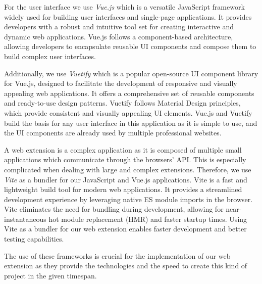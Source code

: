 For the user interface we use \emph{Vue.js} \cite{vuejs} which is a versatile JavaScript framework widely used for building user
interfaces and single-page applications. It provides developers with a robust and intuitive tool set for creating interactive
and dynamic web applications. Vue.js follows a component-based architecture, allowing developers to encapsulate reusable
UI components and compose them to build complex user interfaces.

Additionally, we use \emph{Vuetify} \cite{vuetify} which is a popular open-source UI component library for Vue.js, designed
to facilitate the development of responsive and visually appealing web applications. It offers a comprehensive set of reusable
components and ready-to-use design patterns. Vuetify follows Material Design principles, which provide consistent and visually
appealing UI elements. Vue.js and Vuetify build the basis for any user interface in this application as it is simple to use, and 
the UI components are already used by multiple professional websites.

A web extension is a complex application as it is composed of multiple small applications which communicate through the browsers' API. This
is especially complicated when dealing with large and complex extensions. Therefore, we use \emph{Vite} \cite{vite} as a bundler
for our JavaScript and Vue.js applications. Vite is a fast and lightweight build tool for modern web applications. It provides
a streamlined development experience by leveraging native ES module imports in the browser. Vite eliminates the need for
bundling during development, allowing for near-instantaneous hot module replacement (HMR) and faster startup times. Using Vite as a bundler
for our web extension enables faster development and better testing capabilities.

The use of these frameworks is crucial for the implementation of our web extension as they provide the technologies and the speed to create
this kind of project in the given timespan. 
